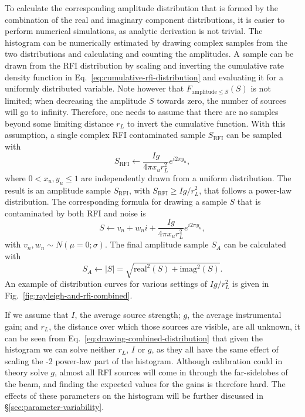\documentclass[useAMS,usenatbib]{mn2e}
\begin{document}
To calculate the corresponding amplitude distribution that is formed by the combination of the real and imaginary component distributions, it is easier to perform numerical simulations, as analytic derivation is not trivial. The histogram can be numerically estimated by drawing complex samples from the two distributions and calculating and counting the amplitudes. A sample can be drawn from the RFI distribution by scaling and inverting the cumulative rate density function in Eq.~\eqref{eq:cumulative-rfi-distribution} and evaluating it for a uniformly distributed variable. Note however that $F_{\textrm{amplitude}\le S}(S)$ is not limited; when decreasing the amplitude $S$ towards zero, the number of sources will go to infinity. Therefore, one needs to assume that there are no samples beyond some limiting distance $r_L$ to invert the cumulative function. With this assumption, a single complex RFI contaminated sample $S_{\textrm{RFI}}$ can be sampled with
\begin{equation} \label{eq:drawing-rfi-distribution}
S_{\textrm{RFI}} \leftarrow \frac{Ig}{4\pi x_u r_L^2} e^{i 2 \pi y_u},
\end{equation}
where $0 < x_u, y_u \le 1$ are independently drawn from a uniform distribution. The result is an amplitude sample $S_{\textrm{RFI}}$, with $S_{\textrm{RFI}} \ge Ig/r_L^2$, that follows a power-law distribution. The corresponding formula for drawing a sample $S$ that is contaminated by both RFI and noise is
\begin{equation} \label{eq:drawing-combined-distribution}
S \leftarrow v_n + w_n i + \frac{Ig}{4\pi x_u r_L^2} e^{i 2 \pi y_u},
\end{equation}
with $v_n, w_n \sim N(\mu=0; \sigma)$. The final amplitude sample $S_A$ can be calculated with 
\begin{equation} \label{eq:drawing-amplitudes}
S_A \leftarrow |S| = \sqrt{\textrm{real}^2({S})+\textrm{imag}^2({S})}.
\end{equation}
An example of distribution curves for various settings of $Ig/r_L^2$ is given in Fig.~\ref{fig:rayleigh-and-rfi-combined}.

If we assume that $I$, the average source strength; $g$, the average instrumental gain; and $r_L$, the distance over which those sources are visible, are all unknown, it can be seen from Eq.~\eqref{eq:drawing-combined-distribution} that given the histogram we can solve neither $r_L$, $I$ or $g$, as they all have the same effect of scaling the -2 power-law part of the histogram. Although calibration could in theory solve $g$, almost all RFI sources will come in through the far-sidelobes of the beam, and finding the expected values for the gains is therefore hard. The effects of these parameters on the histogram will be further discussed in \S\ref{sec:parameter-variability}.
\end{document}
